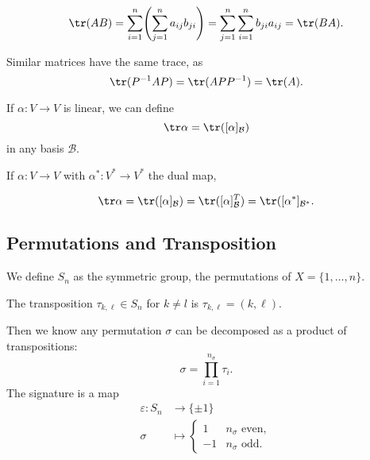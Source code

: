 \documentclass[12pt]{article}
\begin{document}
\begin{proofbox}
\[
	\tr (AB) = \sum_{i = 1}^{n} \Biggl( \sum_{j = 1}^{n} a_{ij} b_{ji} \Biggr) = \sum_{j = 1}^{n} \sum_{i = 1}^{n} b_{ji} a_{ij} = \tr (BA)
.\]
\end{proofbox}

\begin{corollary}
	Similar matrices have the same trace, as
	\[
		\tr(P^{-1}AP) = \tr(APP^{-1}) = \tr(A)
	.\] 
\end{corollary}

\begin{definition}
	If $\alpha : V \to V$ is linear, we can define
	\[
		\tr \alpha = \tr([\alpha]_{\mathcal{B}})
	\]
	in any basis $\mathcal{B}$.
\end{definition}

\begin{lemma}
	If $\alpha : V \to V$ with $\alpha^{\ast} : V^{\ast} \to V^{\ast}$ the dual map,
\end{lemma}

\begin{proofbox}
	\[
		\tr \alpha = \tr([\alpha]_{\mathcal{B}}) = \tr([\alpha]_{\mathcal{B}}^{T}) = \tr([\alpha^{\ast}]_{\mathcal{B}^{\ast}}
	.\]
\end{proofbox}

\subsection{Permutations and Transposition}%
\label{sub:permutations_and_transposition}

We define $S_n$ as the symmetric group, the permutations of $X = \{1, \ldots, n\}$.

The transposition $\tau_{k, \ell} \in S_n$ for $k \neq l$ is $\tau_{k, \ell} = (k, \ell)$.

Then we know any permutation $\sigma$ can be decomposed as a product of transpositions:
\[
\sigma = \prod_{i = 1}^{n_{\sigma}} \tau_i
.\]
The signature is a map
\begin{align*}
	\varepsilon : S_n &\to \{\pm 1\} \\
	\sigma &\mapsto
	\begin{cases}
		1 & n_{\sigma} \text{ even},\\
		-1 & n_{\sigma} \text{ odd}.
	\end{cases}
\end{align*}
\end{document}
